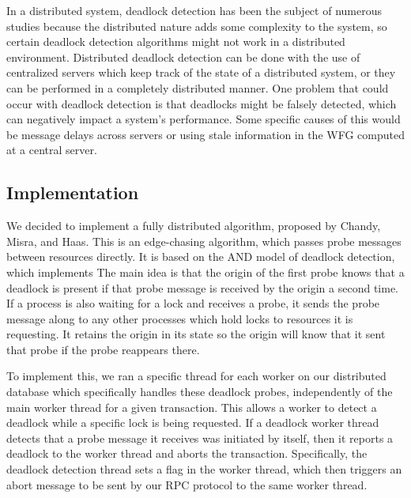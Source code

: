 \documentclass[a4paper, 10pt, notitlepage]{report}
\begin{document}
In a distributed system, deadlock detection has been the subject of numerous studies because the distributed nature adds some complexity to the system, so certain deadlock detection algorithms might not work in a distributed environment. Distributed deadlock detection can be done with the use of centralized servers which keep track of the state of a distributed system, or they can be performed in a completely distributed manner. One problem that could occur with deadlock detection is that deadlocks might be falsely detected, which can negatively impact a system's performance. Some specific causes of this would be message delays across servers or using stale information in the WFG computed at a central server.

\subsection*{Implementation}
We decided to implement a fully distributed algorithm, proposed by Chandy, Misra, and Haas. This is an edge-chasing algorithm, which passes probe messages between resources directly. It is based on the AND model of deadlock detection, which implements The main idea is that the origin of the first probe knows that a deadlock is present if that probe message is received by the origin a second time. If a process is also waiting for a lock and receives a probe, it sends the probe message along to any other processes which hold locks to resources it is requesting. It retains the origin in its state so the origin will know that it sent that probe if the probe reappears there.

To implement this, we ran a specific thread for each worker on our distributed database which specifically handles these deadlock probes, independently of the main worker thread for a given transaction. This allows a worker to detect a deadlock while a specific lock is being requested. If a deadlock worker thread detects that a probe message it receives was initiated by itself, then it reports a deadlock to the worker thread and aborts the transaction. Specifically, the deadlock detection thread sets a flag in the worker thread, which then triggers an abort message to be sent by our RPC protocol to the same worker thread.
\end{document}
